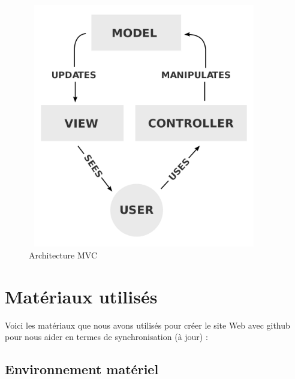 \documentclass[12pt]{report}
\begin{document}
\vspace{0.5in}

\begin{figure}[h]
\centering
    \includegraphics[width = 4.0in, height = 4.2in]{../Images/MVC.png}
\caption{Architecture MVC}
\end{figure}

\newpage

\section{Matériaux utilisés}

Voici les matériaux que nous avons utilisés pour créer le site Web avec github pour nous aider en termes de synchronisation (à jour) :

\subsection{Environnement matériel}

\vspace{0.1in}
\end{document}
